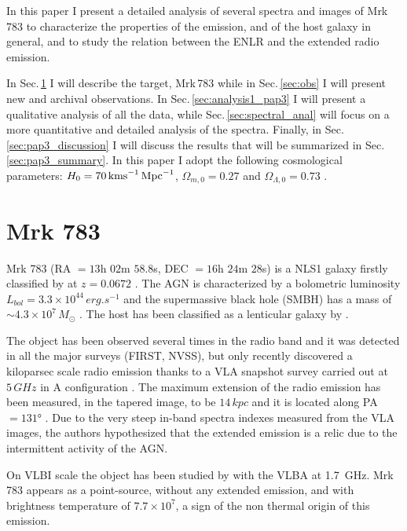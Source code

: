 \documentclass[../main.tex]{subfiles}
\begin{document}
In this paper I present a detailed analysis of several spectra and images of Mrk\,783 to characterize the properties of the emission, and of the host galaxy in general, and to study the relation between the ENLR and the extended radio emission.

In Sec.\,\ref{sec:pap3_mrk783} I will describe the target, Mrk\,783 while in Sec.\,\ref{sec:obs} I will present new and archival observations.
In Sec.\,\ref{sec:analysis1_pap3} I will present a qualitative analysis of all the data, while Sec.\,\ref{sec:spectral_anal} will focus on a more quantitative and detailed analysis of the spectra.
Finally, in Sec.\,\ref{sec:pap3_discussion} I will discuss the results that will be summarized in Sec.\,\ref{sec:pap3_summary}.
In this paper I adopt the following cosmological parameters: $H_0 = 70\,\si{\kms.Mpc^{-1}}$, $\Omega_{m,0} = 0.27$ and $\Omega_{\Lambda,0} = 0.73$ \citep{Komatsu11}.

\section{Mrk 783}
\label{sec:pap3_mrk783}

Mrk 783 (RA $= 13$h $02$m $58.8$s, DEC $=16$h $24$m $28$s) is a NLS1 galaxy firstly classified by \citet{Osterbrock85} at $z = 0.0672$ \citep{Hewitt91}.
The AGN is characterized by a bolometric luminosity $L_{bol} = 3.3\times 10^{44}\,\si{erg.s^{-1}}$ and the supermassive black hole (SMBH) has a mass of $\sim 4.3\times10^{7}\,\si{M_{\odot}}$ \citep{Berton15a}.
The host has been classified as a lenticular galaxy by \citet{Petrosian07}.

The object has been observed several times in the radio band and it was detected in all the major surveys (FIRST, NVSS), but only recently \citet{Congiu17} discovered a kiloparsec scale radio emission thanks to a VLA snapshot survey carried out at $5\,\si{GHz}$ in A configuration \citep{Berton18}.
The maximum extension of the radio emission has been measured, in the tapered image, to be $14\,\si{kpc}$ and it is located along PA $= \ang{131}$ \citep{Congiu17}.
Due to the very steep in-band spectra indexes measured from the VLA images, the authors hypothesized that the extended emission is a relic due to the intermittent activity of the AGN.

On VLBI scale the object has been studied by \citet{Doi13} with the VLBA at \SI{1.7}{GHz}.
Mrk 783 appears as a point-source, without any extended emission, and with brightness temperature of $7.7\times10^7$, a sign of the non thermal origin of this emission.
\end{document}

